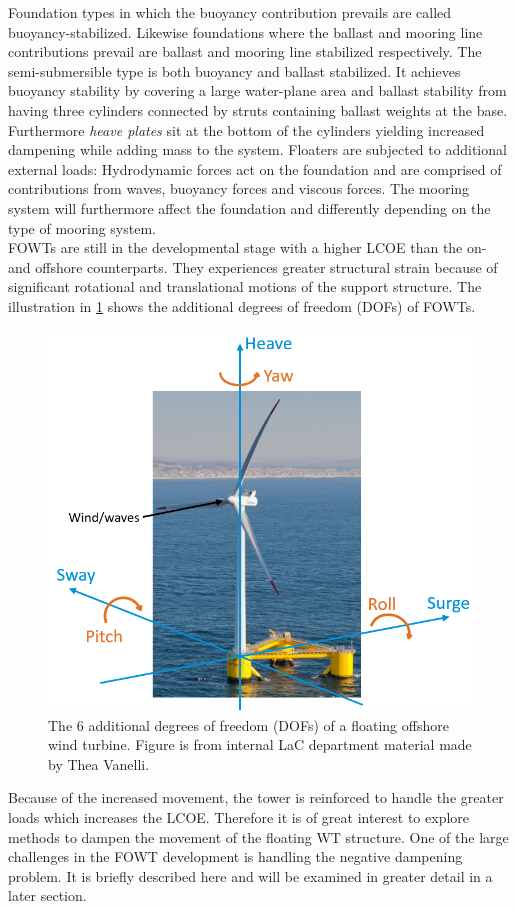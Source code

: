 Foundation types in which the buoyancy contribution prevails are called buoyancy-stabilized. Likewise foundations where the ballast and mooring line contributions prevail are ballast and mooring line stabilized respectively. The semi-submersible type is both buoyancy and ballast stabilized. It achieves buoyancy stability by covering a large water-plane area and ballast stability from having three cylinders connected by struts containing ballast weights at the base. Furthermore \textit{heave plates} sit at the bottom of the cylinders yielding increased dampening while adding mass to the system.
Floaters are subjected to additional external loads: Hydrodynamic forces act on the foundation and are comprised of contributions from waves, buoyancy forces and viscous forces. The mooring system will furthermore affect the foundation and differently depending on the type of mooring system.\\

FOWTs are still in the developmental stage with a higher LCOE than the on- and offshore counterparts. They experiences greater structural strain because of significant rotational and translational motions of the support structure. The illustration in \cref{fig:fowt_coordinates} shows the additional degrees of freedom (DOFs) of FOWTs.
\begin{figure}[ht]
	\centering
	\includegraphics[width=0.55\linewidth]{Graphics/FOWTcoordinates.png}
	\caption{The 6 additional degrees of freedom (DOFs) of a floating offshore wind turbine. Figure is from internal LaC department material made by Thea Vanelli.}
	\label{fig:fowt_coordinates}
\end{figure}
Because of the increased movement, the tower is reinforced to handle the greater loads which increases the LCOE. Therefore it is of great interest to explore methods to dampen the movement of the floating WT structure. One of the large challenges in the FOWT development is handling the negative dampening problem. It is briefly described here and will be examined in greater detail in a later section.

